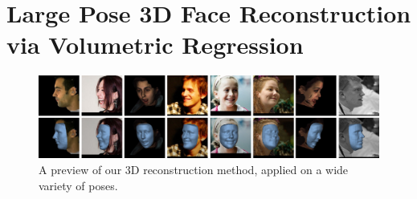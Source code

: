 \graphicspath{{chapter_faces/}}
\chapter{Large Pose 3D Face Reconstruction via Volumetric Regression}
\label{chapter:face}

\begin{figure}
  \includegraphics[width=\linewidth]{img/preview.png}
  \caption[A 3D Reconstruction Preview]{A preview of our 3D
    reconstruction method, applied on a wide variety of poses.}
  \label{c:face:fig:preview}
\end{figure}

